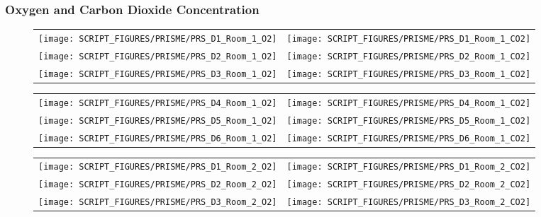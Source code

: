 \clearpage

\subsubsection{Oxygen and Carbon Dioxide Concentration}

\begin{figure}[!ht]
\begin{tabular*}{\textwidth}{l@{\extracolsep{\fill}}r}
\texttt{[image: SCRIPT\_FIGURES/PRISME/PRS\_D1\_Room\_1\_O2]} &
\texttt{[image: SCRIPT\_FIGURES/PRISME/PRS\_D1\_Room\_1\_CO2]} \\
\texttt{[image: SCRIPT\_FIGURES/PRISME/PRS\_D2\_Room\_1\_O2]} &
\texttt{[image: SCRIPT\_FIGURES/PRISME/PRS\_D2\_Room\_1\_CO2]} \\
\texttt{[image: SCRIPT\_FIGURES/PRISME/PRS\_D3\_Room\_1\_O2]} &
\texttt{[image: SCRIPT\_FIGURES/PRISME/PRS\_D3\_Room\_1\_CO2]}
\end{tabular*}
\label{PRISME_Gas_1}
\end{figure}

\begin{figure}[p]
\begin{tabular*}{\textwidth}{l@{\extracolsep{\fill}}r}
\texttt{[image: SCRIPT\_FIGURES/PRISME/PRS\_D4\_Room\_1\_O2]} &
\texttt{[image: SCRIPT\_FIGURES/PRISME/PRS\_D4\_Room\_1\_CO2]} \\
\texttt{[image: SCRIPT\_FIGURES/PRISME/PRS\_D5\_Room\_1\_O2]} &
\texttt{[image: SCRIPT\_FIGURES/PRISME/PRS\_D5\_Room\_1\_CO2]} \\
\texttt{[image: SCRIPT\_FIGURES/PRISME/PRS\_D6\_Room\_1\_O2]} &
\texttt{[image: SCRIPT\_FIGURES/PRISME/PRS\_D6\_Room\_1\_CO2]}
\end{tabular*}
\label{PRISME_Gas_2}
\end{figure}

\begin{figure}[p]
\begin{tabular*}{\textwidth}{l@{\extracolsep{\fill}}r}
\texttt{[image: SCRIPT\_FIGURES/PRISME/PRS\_D1\_Room\_2\_O2]} &
\texttt{[image: SCRIPT\_FIGURES/PRISME/PRS\_D1\_Room\_2\_CO2]} \\
\texttt{[image: SCRIPT\_FIGURES/PRISME/PRS\_D2\_Room\_2\_O2]} &
\texttt{[image: SCRIPT\_FIGURES/PRISME/PRS\_D2\_Room\_2\_CO2]} \\
\texttt{[image: SCRIPT\_FIGURES/PRISME/PRS\_D3\_Room\_2\_O2]} &
\texttt{[image: SCRIPT\_FIGURES/PRISME/PRS\_D3\_Room\_2\_CO2]}
\end{tabular*}
\label{PRISME_Gas_3}
\end{figure}

